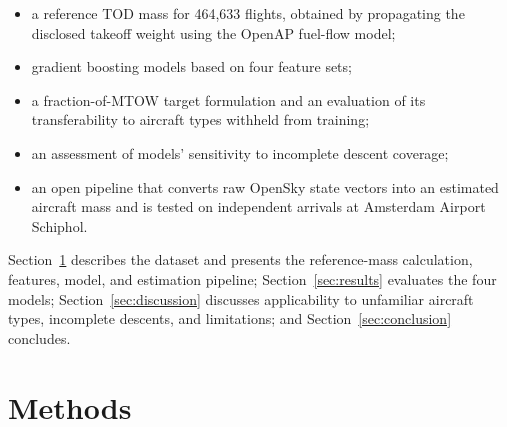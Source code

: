\documentclass[
  manuscript=proceedings,  %
  layout=preprint,  %
  year=2026,
  volume=x,
]{extra/joas}
\begin{document}
\begin{itemize}
\item a reference TOD mass for 464{,}633 flights, obtained by propagating the disclosed takeoff weight using the OpenAP fuel-flow model;
\item gradient boosting models based on four feature sets;
\item a fraction-of-MTOW target formulation and an evaluation of its transferability to aircraft types withheld from training;
\item an assessment of models' sensitivity to incomplete descent coverage;
\item an open pipeline that converts raw OpenSky state vectors into an estimated aircraft mass and is tested on independent arrivals at Amsterdam Airport Schiphol.
\end{itemize}

Section~\ref{sec:method} describes the dataset and presents the reference-mass calculation, features, model, and estimation pipeline; Section~\ref{sec:results} evaluates the four models; Section~\ref{sec:discussion} discusses applicability to unfamiliar aircraft types, incomplete descents, and limitations; and Section~\ref{sec:conclusion} concludes.

\section{Methods}
\label{sec:method}
\end{document}
